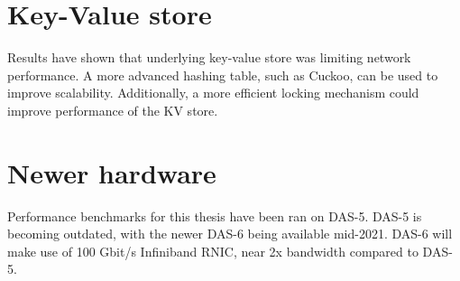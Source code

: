 \section{Key-Value store}
Results have shown that underlying key-value store was limiting network performance.
A more advanced hashing table, such as Cuckoo\cite{pagh2004cuckoo}, can be used to improve scalability.
Additionally, a more efficient locking mechanism could improve performance of the KV store.

\section{Newer hardware}
Performance benchmarks for this thesis have been ran on DAS-5.
DAS-5 is becoming outdated, with the newer DAS-6 being available mid-2021\cite{das6}.
DAS-6 will make use of 100 Gbit/s Infiniband RNIC, near 2x bandwidth compared to DAS-5.

